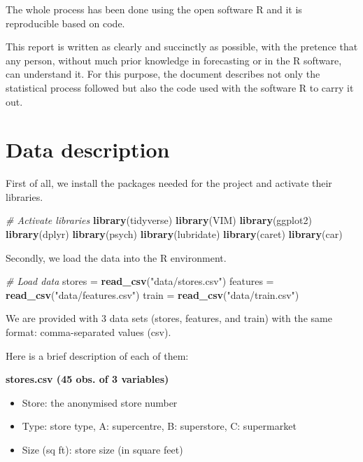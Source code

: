 \documentclass[11pt,]{article}
\newenvironment{Shaded}{\begin{snugshade}}{\end{snugshade}}
\newcommand{\KeywordTok}[1]{\textcolor[rgb]{0.13,0.29,0.53}{\textbf{{#1}}}}
\newcommand{\StringTok}[1]{\textcolor[rgb]{0.31,0.60,0.02}{{#1}}}
\newcommand{\CommentTok}[1]{\textcolor[rgb]{0.56,0.35,0.01}{\textit{{#1}}}}
\newcommand{\NormalTok}[1]{{#1}}
\providecommand{\tightlist}{%
  \setlength{\itemsep}{0pt}\setlength{\parskip}{0pt}}
\begin{document}
The whole process has been done using the open software R and it is
reproducible based on code.

This report is written as clearly and succinctly as possible, with the
pretence that any person, without much prior knowledge in forecasting or
in the R software, can understand it. For this purpose, the document
describes not only the statistical process followed but also the code
used with the software R to carry it out.

\section{Data description}\label{data-description}

First of all, we install the packages needed for the project and
activate their libraries.

\begin{Shaded}
\begin{Highlighting}[]
\CommentTok{# Activate libraries}
\KeywordTok{library}\NormalTok{(tidyverse)}
\KeywordTok{library}\NormalTok{(VIM)}
\KeywordTok{library}\NormalTok{(ggplot2)}
\KeywordTok{library}\NormalTok{(dplyr)}
\KeywordTok{library}\NormalTok{(psych)}
\KeywordTok{library}\NormalTok{(lubridate)}
\KeywordTok{library}\NormalTok{(caret)}
\KeywordTok{library}\NormalTok{(car)}
\end{Highlighting}
\end{Shaded}

Secondly, we load the data into the R environment.

\begin{Shaded}
\begin{Highlighting}[]
\CommentTok{# Load data}
\NormalTok{stores =}\StringTok{ }\KeywordTok{read_csv}\NormalTok{(}\StringTok{"data/stores.csv"}\NormalTok{)}
\NormalTok{features =}\StringTok{ }\KeywordTok{read_csv}\NormalTok{(}\StringTok{"data/features.csv"}\NormalTok{)}
\NormalTok{train =}\StringTok{ }\KeywordTok{read_csv}\NormalTok{(}\StringTok{"data/train.csv"}\NormalTok{)}
\end{Highlighting}
\end{Shaded}

We are provided with 3 data sets (stores, features, and train) with the
same format: comma-separated values (csv).

Here is a brief description of each of them:

\textbf{stores.csv (45 obs. of 3 variables)}

\begin{itemize}
\tightlist
\item
  Store: the anonymised store number 
\item
  Type: store type, A: supercentre, B: superstore, C: supermarket 
\item
  Size (sq ft): store size (in square feet) 
\end{itemize}
\end{document}
